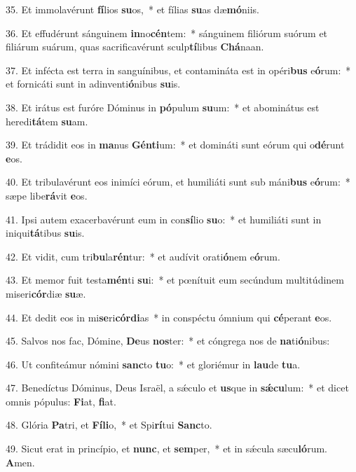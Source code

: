 35. Et immolavérunt \textbf{fí}lios \textbf{su}os,~*  et fílias \textbf{su}as dæ\textbf{mó}niis.\

36. Et effudérunt sánguinem \textbf{in}no\textbf{cén}tem:~*  sánguinem filiórum suórum et filiárum suárum, quas sacrificavérunt sculp\textbf{tí}libus \textbf{Chá}naan.\

37. Et infécta est terra in sanguínibus, et contamináta est in opéri\textbf{bus} e\textbf{ó}rum:~*  et fornicáti sunt in adinventi\textbf{ó}nibus \textbf{su}is.\

38. Et irátus est furóre Dóminus in \textbf{pó}pulum \textbf{su}um:~*  et abominátus est heredi\textbf{tá}tem \textbf{su}am.\

39. Et trádidit eos in \textbf{ma}nus \textbf{Gén}\textbf{ti}um:~*  et domináti sunt eórum qui o\textbf{dé}runt \textbf{e}os.\

40. Et tribulavérunt eos inimíci eórum, et humiliáti sunt sub máni\textbf{bus} e\textbf{ó}rum:~*  sæpe libe\textbf{rá}vit \textbf{e}os.\

41. Ipsi autem exacerbavérunt eum in con\textbf{sí}lio \textbf{su}o:~*  et humiliáti sunt in iniqui\textbf{tá}tibus \textbf{su}is.\

42. Et vidit, cum tri\textbf{bu}la\textbf{rén}tur:~*  et audívit orati\textbf{ó}nem e\textbf{ó}rum.\

43. Et memor fuit testa\textbf{mén}ti \textbf{su}i:~*  et pœnítuit eum secúndum multitúdinem miseri\textbf{cór}diæ \textbf{su}æ.\

44. Et dedit eos in mi\textbf{se}ri\textbf{cór}\textbf{di}as~*  in conspéctu ómnium qui \textbf{cé}perant \textbf{e}os.\

45. Salvos nos fac, Dómine, \textbf{De}us \textbf{nos}ter:~*  et cóngrega nos de \textbf{na}ti\textbf{ó}nibus:\

46. Ut confiteámur nómini \textbf{sanc}to \textbf{tu}o:~*  et gloriémur in \textbf{lau}de \textbf{tu}a.\

47. Benedíctus Dóminus, Deus Israël, a sǽculo et \textbf{us}que in \textbf{sǽ}\textbf{cu}lum:~*  et dicet omnis pópulus: \textbf{Fi}at, \textbf{fi}at.\

48. Glória \textbf{Pa}tri, et \textbf{Fí}\textbf{li}o,~*  et Spi\textbf{rí}tui \textbf{Sanc}to.\

49. Sicut erat in princípio, et \textbf{nunc}, et \textbf{sem}per,~*  et in sǽcula sæcu\textbf{ló}rum. \textbf{A}men.\

